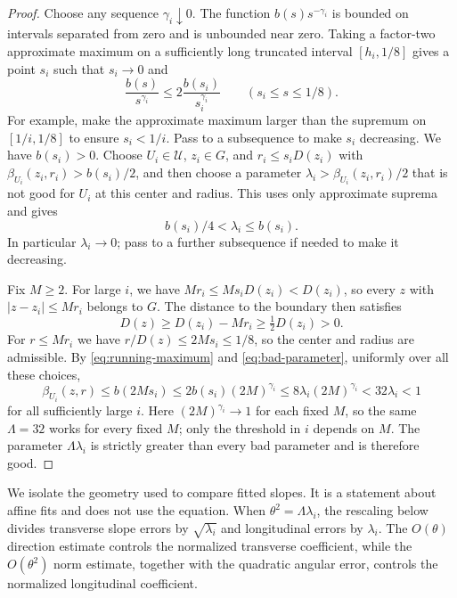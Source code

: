 \documentclass[11pt]{article}
\numberwithin{equation}{section}
\theoremstyle{definition}
\theoremstyle{remark}
\begin{document}
\begin{proof}
Choose any sequence $\gamma_i\downarrow0$. The function $b(s)s^{-\gamma_i}$ is bounded on intervals separated from zero and is unbounded near zero. Taking a factor-two approximate maximum on a sufficiently long truncated interval $[h_i,1/8]$ gives a point $s_i$ such that $s_i\to0$ and
\begin{equation}\label{eq:running-maximum}
  \frac{b(s)}{s^{\gamma_i}}
     \le2\frac{b(s_i)}{s_i^{\gamma_i}}\qquad(s_i\le s\le1/8).
\end{equation}
For example, make the approximate maximum larger than the supremum on $[1/i,1/8]$ to ensure $s_i<1/i$. Pass to a subsequence to make $s_i$ decreasing. We have $b(s_i)>0$. Choose $U_i\in\mathcal U$, $z_i\in G$, and $r_i\le s_iD(z_i)$ with $\beta_{U_i}(z_i,r_i)>b(s_i)/2$, and then choose a parameter $\lambda_i>\beta_{U_i}(z_i,r_i)/2$ that is not good for $U_i$ at this center and radius. This uses only approximate suprema and gives
\begin{equation}\label{eq:bad-parameter}
  b(s_i)/4<\lambda_i\le b(s_i).
\end{equation}
In particular $\lambda_i\to0$; pass to a further subsequence if needed to make it decreasing.

Fix $M\ge2$. For large $i$, we have $Mr_i\le Ms_iD(z_i)<D(z_i)$, so every $z$ with $|z-z_i|\le Mr_i$ belongs to $G$. The distance to the boundary then satisfies
\[
  D(z)\ge D(z_i)-Mr_i\ge\tfrac12D(z_i)>0.
\]
For $r\le Mr_i$ we have $r/D(z)\le2Ms_i\le1/8$, so the center and radius are admissible. By \eqref{eq:running-maximum} and \eqref{eq:bad-parameter}, uniformly over all these choices,
\[
  \beta_{U_i}(z,r)\le b(2Ms_i)
     \le2b(s_i)(2M)^{\gamma_i}
     \le8\lambda_i(2M)^{\gamma_i}
     <32\lambda_i<1
\]
for all sufficiently large $i$. Here $(2M)^{\gamma_i}\to1$ for each fixed $M$, so the same $\Lambda=32$ works for every fixed $M$; only the threshold in $i$ depends on $M$. The parameter $\Lambda\lambda_i$ is strictly greater than every bad parameter and is therefore good.
\end{proof}

We isolate the geometry used to compare fitted slopes. It is a statement about affine fits and does not use the equation. When $\theta^2=\Lambda\lambda_i$, the rescaling below divides transverse slope errors by $\sqrt{\lambda_i}$ and longitudinal errors by $\lambda_i$. The $O(\theta)$ direction estimate controls the normalized transverse coefficient, while the $O(\theta^2)$ norm estimate, together with the quadratic angular error, controls the normalized longitudinal coefficient.
\end{document}
